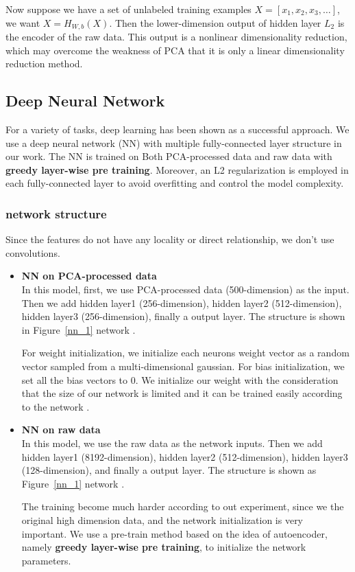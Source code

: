 \documentclass[sigconf]{acmart}
\begin{document}
Now suppose we have  a set of unlabeled training examples $X=[x_1,x_2,x_3,\dots]$, we want $X=H_{W,b}(X)$. Then the lower-dimension output of hidden layer $L_2$ is the encoder of the raw data. This output is a nonlinear dimensionality reduction, which may overcome the weakness of PCA that it is only a linear dimensionality reduction method.


\subsection{Deep Neural Network}
For a variety of tasks, deep learning \cite{Deeplearning} has been shown as a successful approach. We use a deep neural network (NN) with multiple fully-connected layer structure in our work. The NN is trained on Both PCA-processed data and raw data with \textbf{greedy layer-wise pre training}. Moreover, an L2 regularization is employed in each fully-connected layer to avoid overfitting and control the model complexity.
\subsubsection{network structure} Since the features do not have any locality or direct relationship, we don't use convolutions.\\

\begin{itemize}
	\item \textbf{NN on PCA-processed data}\\
	In this model, first, we use PCA-processed data (500-dimension) as the input. Then we add hidden layer1 (256-dimension), hidden layer2 (512-dimension), hidden layer3 (256-dimension), finally a output layer. The structure is shown in Figure~\ref{nn_1} network . 
	
	For weight initialization, we initialize each neurons weight vector as a random vector sampled from a multi-dimensional gaussian. For bias initialization, we set all the bias vectors to $0$. We initialize our weight with the consideration that the size of our network is limited and it can be trained easily according to the network .
	
	\item \textbf{NN on raw data}\\
	In this model, we use the raw data as the network inputs. Then we add hidden layer1 (8192-dimension), hidden layer2 (512-dimension), hidden layer3 (128-dimension), and finally a output layer.  The structure is shown as Figure~\ref{nn_1} network . 
	
	The training become much harder according to out experiment, since we the original high dimension data,  and the network initialization is very important. We use a pre-train method based on the idea of autoencoder, namely \textbf{greedy layer-wise pre training}, to initialize the network parameters. 
\end{itemize}
\end{document}

